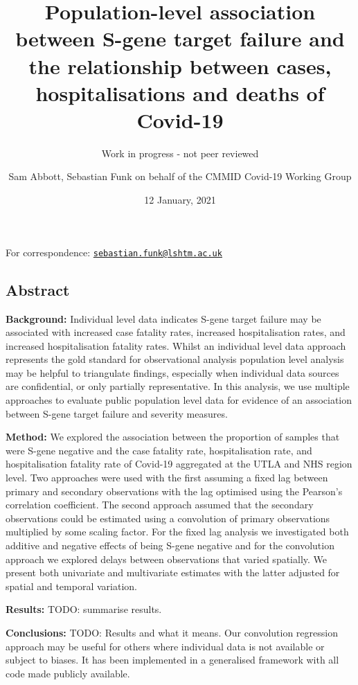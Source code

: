 \documentclass[
]{article}
\title{Population-level association between S-gene target failure and the
relationship between cases, hospitalisations and deaths of Covid-19}
\subtitle{Work in progress - not peer reviewed}
\author{Sam Abbott, Sebastian Funk on behalf of the CMMID Covid-19 Working Group}
\date{12 January, 2021}
\begin{document}
\maketitle

For correspondence:
\href{mailto:sebastian.funk@lshtm.ac.uk}{\nolinkurl{sebastian.funk@lshtm.ac.uk}}

\hypertarget{abstract}{%
\subsection{Abstract}\label{abstract}}

\textbf{Background:} Individual level data indicates S-gene target
failure may be associated with increased case fatality rates, increased
hospitalisation rates, and increased hospitalisation fatality rates.
Whilst an individual level data approach represents the gold standard
for observational analysis population level analysis may be helpful to
triangulate findings, especially when individual data sources are
confidential, or only partially representative. In this analysis, we use
multiple approaches to evaluate public population level data for
evidence of an association between S-gene target failure and severity
measures.

\textbf{Method:} We explored the association between the proportion of
samples that were S-gene negative and the case fatality rate,
hospitalisation rate, and hospitalisation fatality rate of Covid-19
aggregated at the UTLA and NHS region level. Two approaches were used
with the first assuming a fixed lag between primary and secondary
observations with the lag optimised using the Pearson's correlation
coefficient. The second approach assumed that the secondary observations
could be estimated using a convolution of primary observations
multiplied by some scaling factor. For the fixed lag analysis we
investigated both additive and negative effects of being S-gene negative
and for the convolution approach we explored delays between observations
that varied spatially. We present both univariate and multivariate
estimates with the latter adjusted for spatial and temporal variation.

\textbf{Results:} TODO: summarise results.

\textbf{Conclusions:} TODO: Results and what it means. Our convolution
regression approach may be useful for others where individual data is
not available or subject to biases. It has been implemented in a
generalised framework with all code made publicly available.
\end{document}
